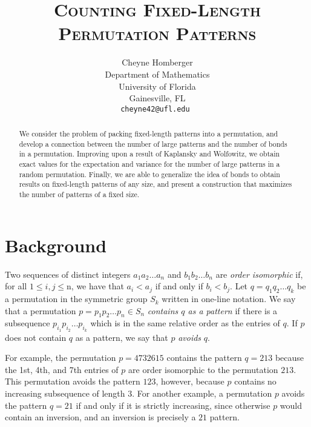 \documentclass[11pt]{article}
\theoremstyle{plain}
\theoremstyle{definition}
\begin{document}
\title{\scshape Counting Fixed-Length Permutation Patterns}
\author{Cheyne Homberger \\
\small Department of Mathematics \\[-0.8ex]
\small University of Florida \\[-0.8ex]
\small Gainesville, FL \\
\small\tt cheyne42@ufl.edu }

\maketitle


\begin{abstract} 
  We consider the problem of packing fixed-length patterns into a permutation,
  and develop a connection between the number of large patterns and the number
  of bonds in a permutation. Improving upon a result of Kaplansky and Wolfowitz,
  we obtain exact values for the expectation and variance for the number of
  large patterns in a random permutation. Finally, we are able to generalize the
  idea of bonds to obtain results on fixed-length patterns of any size, and
  present a construction that maximizes the number of patterns of a fixed size.  
\end{abstract}


\section{Background}
  
  Two sequences of distinct integers $a_1 a_2 \ldots a_n$ and $b_1 b_2 \ldots
  b_n$ are \emph{order isomorphic} if, for all $1 \leq i,j \leq $n, we have that
  $a_i < a_j$ if and only if $b_i < b_j$.  Let $q = q_1 q_2 \ldots q_k$ be a
  permutation in the symmetric group $S_k$ written in one-line notation. We say
  that a permutation $p = p_1 p_2 \ldots p_n \in S_n$ \emph{contains $q$ as a
  pattern} if there is a subsequence $p_{i_1} p_{i_2} \ldots p_{i_k}$ which is
  in the same relative order as the entries of $q$. If $p$ does not contain $q$
  as a pattern, we say that $p$ \emph{avoids} $q$. 

  For example, the permutation $p = 4732615$ contains the pattern $q = 213$ because
  the 1st, 4th, and 7th entries of $p$ are order isomorphic to the permutation
  $213$. This permutation avoids the pattern $123$, however, because $p$
  contains no increasing subsequence of length $3$. For another example, a
  permutation $p$ avoids the pattern $q = 21$ if and only if it is strictly
  increasing, since otherwise $p$ would contain an inversion, and an inversion
  is precisely a $21$ pattern.
  
\end{document}
